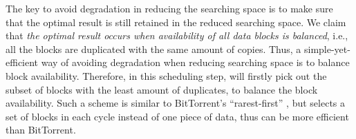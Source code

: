 The key to avoid degradation in reducing the searching space is to make sure that the optimal result is still retained in the reduced searching space.
We claim that {\em the optimal result occurs when availability of all data blocks is balanced}, i.e., all the blocks are duplicated with the same amount of copies. Thus, a simple-yet-efficient way of avoiding degradation when reducing searching space is to balance block availability. 
Therefore, in this scheduling step, \name will firstly pick out the subset of blocks with the least amount of duplicates, to balance the block availability. Such a scheme is similar to BitTorrent's ``rarest-first'' \cite{Cohen2003Incentives}, but \name selects a set of blocks in each cycle instead of one piece of data, thus can be more efficient than BitTorrent.


